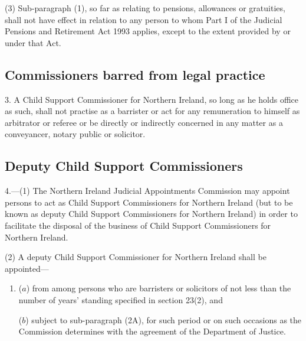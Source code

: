 \documentclass[12pt,a4paper]{article}
\begin{document}
(3) Sub-paragraph (1), so far as relating to pensions, allowances or gratuities, shall not have effect in relation to any person to whom Part I of the Judicial Pensions and Retirement Act 1993 applies, except to the extent provided by or under that Act.


\subsection*{Commissioners barred from legal practice}

3. A Child Support Commissioner for Northern Ireland, so long as he holds office as such, shall not practise as a barrister or act for any remuneration to himself as arbitrator or referee or be directly or indirectly concerned in any matter as a conveyancer, notary public or solicitor.


\subsection*{Deputy Child Support Commissioners}

4.—(1) The Northern Ireland Judicial Appointments Commission may appoint persons to act as Child Support Commissioners for Northern Ireland (but to be known as deputy Child Support Commissioners for Northern Ireland) in order to facilitate the disposal of the business of Child Support Commissioners for Northern Ireland.

(2) A deputy Child Support Commissioner for Northern Ireland shall be appointed---
\begin{enumerate}\item[]
($a$) from among persons who are barristers or solicitors of not less than the number
of years’ standing specified in section 23(2), and

($b$) subject to sub-paragraph (2A), for such period or on such occasions as
the Commission determines with the agreement of the Department of Justice.
\end{enumerate}
\end{document}
